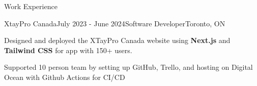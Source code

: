 \documentclass[
	11pt, %
]{resume} %
\begin{document}
\begin{rSection}{Work Experience}

	\begin{rSubsection}{XtayPro Canada}{July 2023 - June 2024}{Software Developer}{Toronto, ON}
		\item Designed and deployed the XTayPro Canada website using \textbf{Next.js} and \textbf{Tailwind CSS} for app with 150+ users.
		\item Supported 10 person team by setting up GitHub, Trello, and hosting on Digital Ocean with Github Actions for CI/CD
	\end{rSubsection}





\end{rSection}

\end{document}

